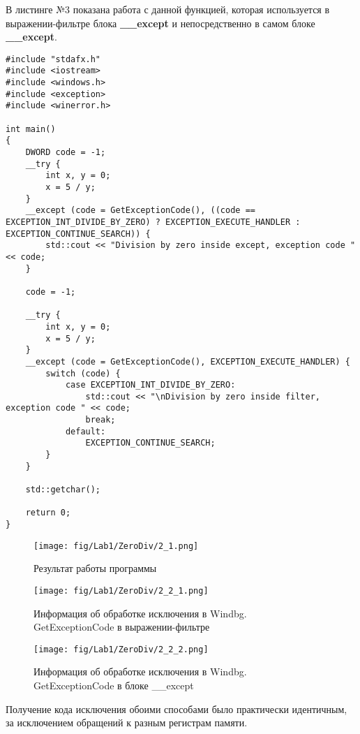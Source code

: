 В листинге №3 показана работа с данной функцией, которая используется в выражении-фильтре блока \textbf{\_\_except} и непосредственно в самом блоке \textbf{\_\_except}.
\begin{lstlisting}[caption=Получение кода исключения с помощью функции GetExceptionCode]
#include "stdafx.h"
#include <iostream>
#include <windows.h>
#include <exception>
#include <winerror.h>

int main()
{
    DWORD code = -1;
    __try {
        int x, y = 0;
        x = 5 / y;
    }
    __except (code = GetExceptionCode(), ((code == EXCEPTION_INT_DIVIDE_BY_ZERO) ? EXCEPTION_EXECUTE_HANDLER : EXCEPTION_CONTINUE_SEARCH)) {
        std::cout << "Division by zero inside except, exception code " << code;
    }

    code = -1;

    __try {
        int x, y = 0;
        x = 5 / y;
    }
    __except (code = GetExceptionCode(), EXCEPTION_EXECUTE_HANDLER) {
        switch (code) {
            case EXCEPTION_INT_DIVIDE_BY_ZERO:
                std::cout << "\nDivision by zero inside filter, exception code " << code;
                break;
            default:
                EXCEPTION_CONTINUE_SEARCH;
        }
    }

    std::getchar();

    return 0;
}
\end{lstlisting}

\begin{figure}[H]
    \begin{center}
        \texttt{[image: fig/Lab1/ZeroDiv/2\_1.png]}
        \caption{Результат работы программы}
        \label{pic:2_1}
    \end{center}
\end{figure}

\begin{figure}[H]
    \begin{center}
        \texttt{[image: fig/Lab1/ZeroDiv/2\_2\_1.png]}
        \caption{Информация об обработке исключения в Windbg. GetExceptionCode в выражении-фильтре}
        \label{pic:2_2_1}
    \end{center}
\end{figure}

\begin{figure}[H]
    \begin{center}
        \texttt{[image: fig/Lab1/ZeroDiv/2\_2\_2.png]}
        \caption{Информация об обработке исключения в Windbg. GetExceptionCode в блоке \_\_except}
        \label{pic:2_2_2}
    \end{center}
\end{figure}
Получение кода исключения обоими способами было практически идентичным, за исключением обращений к разным регистрам памяти.

